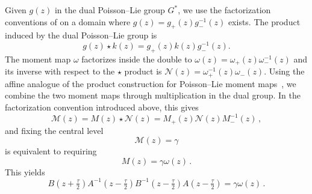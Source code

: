 Given $g(z)$ in the dual Poisson--Lie group $G^*$, we use the factorization conventions of \cite{arutyunov_hyperbolic_2019} on a domain where $g(z)=g_+ (z) g_-^{-1} (z)$ exists. The product induced by the dual Poisson--Lie group is
\begin{equation}
g(z) \star k(z)=g_+(z) k(z) g_-^{-1}(z).
\end{equation}
The moment map $\omega$ factorizes inside the double to $\omega(z) = \omega_+ (z) \omega^{-1}_-(z)$ and its inverse with respect to the $\star$ product is $\mathcal{N}(z) =\omega^{-1}_+ (z) \omega_-(z)$.  
Using the affine analogue of the product construction for Poisson--Lie moment maps~\cite{flaschka_convexity_1996}, we combine the two moment maps through multiplication in the dual group. In the factorization convention introduced above, this gives
\begin{equation}
\mathcal{M}(z)= M(z) \star \mathcal{N}(z)
=M_+(z) \mathcal{N}(z) M_-^{-1}(z) \,,
\end{equation}
and fixing the central level 
\begin{equation}
\mathcal{M}(z) = \gamma
\end{equation}
is equivalent to requiring
\begin{equation}
M(z)= \gamma \omega(z) \,.
\end{equation}
This yields
\begin{equation}
\label{eq:mom_map1eq}
B(z+\tfrac{\tau}{2})A^{-1}(z-\tfrac{\tau}{2})B^{-1}(z-\tfrac{\tau}{2})A(z-\tfrac{\tau}{2}) = \gamma \omega(z) \,.
\end{equation}


